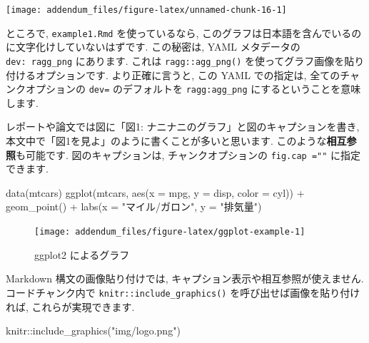 \documentclass[
]{ltjsarticle}
\newenvironment{Shaded}{\begin{snugshade}}{\end{snugshade}}
\newcommand{\AttributeTok}[1]{\textcolor[rgb]{0.77,0.63,0.00}{#1}}
\newcommand{\FunctionTok}[1]{\textcolor[rgb]{0.00,0.00,0.00}{#1}}
\newcommand{\NormalTok}[1]{#1}
\newcommand{\SpecialCharTok}[1]{\textcolor[rgb]{0.00,0.00,0.00}{#1}}
\newcommand{\StringTok}[1]{\textcolor[rgb]{0.31,0.60,0.02}{#1}}
\begin{document}
\begin{center}\texttt{[image: addendum\_files/figure-latex/unnamed-chunk-16-1]} \end{center}

ところで, \texttt{example1.Rmd} を使っているなら, このグラフは日本語を含んでいるのに文字化けしていないはずです. この秘密は, YAML メタデータの \texttt{dev:\ ragg\_png} にあります. これは \texttt{ragg::agg\_png()} を使ってグラフ画像を貼り付けるオプションです. より正確に言うと, この YAML での指定は, 全てのチャンクオプションの \texttt{dev=} のデフォルトを \texttt{ragg:agg\_png} にするということを意味します.

レポートや論文では図に「図1: ナニナニのグラフ」と図のキャプションを書き, 本文中で「図1を見よ」のように書くことが多いと思います. このような\textbf{相互参照}も可能です. 図のキャプションは, チャンクオプションの \texttt{fig.cap\ =""} に指定できます.

\begin{Shaded}
\begin{Highlighting}[numbers=left,,]
\FunctionTok{data}\NormalTok{(mtcars)}
\FunctionTok{ggplot}\NormalTok{(mtcars, }\FunctionTok{aes}\NormalTok{(}\AttributeTok{x =}\NormalTok{ mpg, }\AttributeTok{y =}\NormalTok{ disp, }\AttributeTok{color =}\NormalTok{ cyl)) }\SpecialCharTok{+}
  \FunctionTok{geom\_point}\NormalTok{() }\SpecialCharTok{+}
  \FunctionTok{labs}\NormalTok{(}\AttributeTok{x =} \StringTok{"マイル/ガロン"}\NormalTok{, }\AttributeTok{y =} \StringTok{"排気量"}\NormalTok{)}
\end{Highlighting}
\end{Shaded}

\begin{figure}

{\centering \texttt{[image: addendum\_files/figure-latex/ggplot-example-1]} 

}

\caption{ggplot2 によるグラフ}\label{fig:ggplot-example}
\end{figure}

Markdown 構文の画像貼り付けでは, キャプション表示や相互参照が使えません. コードチャンク内で \texttt{knitr::include\_graphics()} を呼び出せば画像を貼り付ければ, これらが実現できます.

\begin{Shaded}
\begin{Highlighting}[numbers=left,,]
\NormalTok{knitr}\SpecialCharTok{::}\FunctionTok{include\_graphics}\NormalTok{(}\StringTok{"img/logo.png"}\NormalTok{)}
\end{Highlighting}
\end{Shaded}
\end{document}
